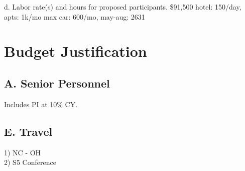 
d. Labor rate(s) and hours for proposed participants.
\$91,500
hotel: 150/day, apts: 1k/mo max
car: 600/mo, may-aug: 2631

\section{Budget Justification}

\subsection{A. Senior Personnel}
 Includes PI at 10\% CY.

\subsection{E. Travel}
1) NC - OH\\
2) S5 Conference

%
